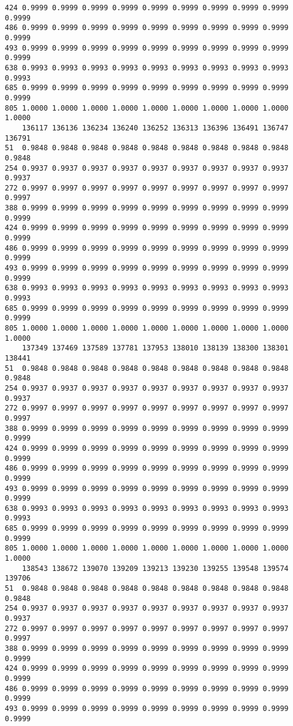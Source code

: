 \documentclass[
]{report}
\begin{document}
\begin{verbatim}
424 0.9999 0.9999 0.9999 0.9999 0.9999 0.9999 0.9999 0.9999 0.9999 0.9999
486 0.9999 0.9999 0.9999 0.9999 0.9999 0.9999 0.9999 0.9999 0.9999 0.9999
493 0.9999 0.9999 0.9999 0.9999 0.9999 0.9999 0.9999 0.9999 0.9999 0.9999
638 0.9993 0.9993 0.9993 0.9993 0.9993 0.9993 0.9993 0.9993 0.9993 0.9993
685 0.9999 0.9999 0.9999 0.9999 0.9999 0.9999 0.9999 0.9999 0.9999 0.9999
805 1.0000 1.0000 1.0000 1.0000 1.0000 1.0000 1.0000 1.0000 1.0000 1.0000
    136117 136136 136234 136240 136252 136313 136396 136491 136747 136791
51  0.9848 0.9848 0.9848 0.9848 0.9848 0.9848 0.9848 0.9848 0.9848 0.9848
254 0.9937 0.9937 0.9937 0.9937 0.9937 0.9937 0.9937 0.9937 0.9937 0.9937
272 0.9997 0.9997 0.9997 0.9997 0.9997 0.9997 0.9997 0.9997 0.9997 0.9997
388 0.9999 0.9999 0.9999 0.9999 0.9999 0.9999 0.9999 0.9999 0.9999 0.9999
424 0.9999 0.9999 0.9999 0.9999 0.9999 0.9999 0.9999 0.9999 0.9999 0.9999
486 0.9999 0.9999 0.9999 0.9999 0.9999 0.9999 0.9999 0.9999 0.9999 0.9999
493 0.9999 0.9999 0.9999 0.9999 0.9999 0.9999 0.9999 0.9999 0.9999 0.9999
638 0.9993 0.9993 0.9993 0.9993 0.9993 0.9993 0.9993 0.9993 0.9993 0.9993
685 0.9999 0.9999 0.9999 0.9999 0.9999 0.9999 0.9999 0.9999 0.9999 0.9999
805 1.0000 1.0000 1.0000 1.0000 1.0000 1.0000 1.0000 1.0000 1.0000 1.0000
    137349 137469 137589 137781 137953 138010 138139 138300 138301 138441
51  0.9848 0.9848 0.9848 0.9848 0.9848 0.9848 0.9848 0.9848 0.9848 0.9848
254 0.9937 0.9937 0.9937 0.9937 0.9937 0.9937 0.9937 0.9937 0.9937 0.9937
272 0.9997 0.9997 0.9997 0.9997 0.9997 0.9997 0.9997 0.9997 0.9997 0.9997
388 0.9999 0.9999 0.9999 0.9999 0.9999 0.9999 0.9999 0.9999 0.9999 0.9999
424 0.9999 0.9999 0.9999 0.9999 0.9999 0.9999 0.9999 0.9999 0.9999 0.9999
486 0.9999 0.9999 0.9999 0.9999 0.9999 0.9999 0.9999 0.9999 0.9999 0.9999
493 0.9999 0.9999 0.9999 0.9999 0.9999 0.9999 0.9999 0.9999 0.9999 0.9999
638 0.9993 0.9993 0.9993 0.9993 0.9993 0.9993 0.9993 0.9993 0.9993 0.9993
685 0.9999 0.9999 0.9999 0.9999 0.9999 0.9999 0.9999 0.9999 0.9999 0.9999
805 1.0000 1.0000 1.0000 1.0000 1.0000 1.0000 1.0000 1.0000 1.0000 1.0000
    138543 138672 139070 139209 139213 139230 139255 139548 139574 139706
51  0.9848 0.9848 0.9848 0.9848 0.9848 0.9848 0.9848 0.9848 0.9848 0.9848
254 0.9937 0.9937 0.9937 0.9937 0.9937 0.9937 0.9937 0.9937 0.9937 0.9937
272 0.9997 0.9997 0.9997 0.9997 0.9997 0.9997 0.9997 0.9997 0.9997 0.9997
388 0.9999 0.9999 0.9999 0.9999 0.9999 0.9999 0.9999 0.9999 0.9999 0.9999
424 0.9999 0.9999 0.9999 0.9999 0.9999 0.9999 0.9999 0.9999 0.9999 0.9999
486 0.9999 0.9999 0.9999 0.9999 0.9999 0.9999 0.9999 0.9999 0.9999 0.9999
493 0.9999 0.9999 0.9999 0.9999 0.9999 0.9999 0.9999 0.9999 0.9999 0.9999

\end{verbatim}
\end{document}
